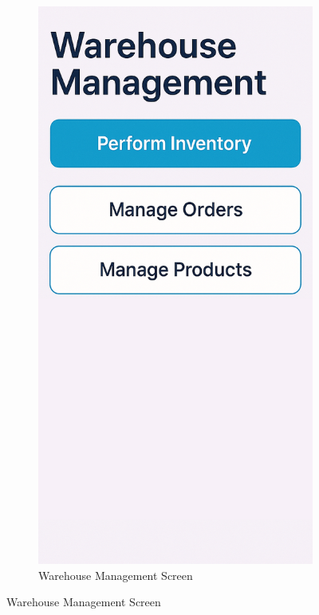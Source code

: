 \documentclass[12pt,a4paper,twoside]{book}
\begin{document}
\begin{figure}[H]
\begin{subfigure}[b]{0.48\textwidth}
    \end{subfigure}
    \hfill
    \begin{subfigure}[b]{0.48\textwidth}
        \centering
        \includegraphics[width=\textwidth,height=0.4\textheight,keepaspectratio]{Mockup Screens/warehouse_management_products.png}
        \caption{Warehouse Management Screen}\label{fig:mockup4}
    \end{subfigure}
\end{figure}
\end{document}
